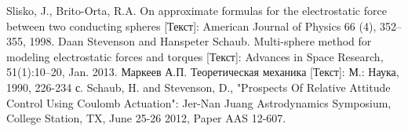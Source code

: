\begin{thebibliography}{99}
 Slisko, J., Brito-Orta, R.A. On approximate formulas for the electrostatic force between two conducting spheres [Текст]: American Journal of Physics 66 (4), 352–355, 1998.
 Daan Stevenson and Hanspeter Schaub. Multi-sphere method for modeling electrostatic forces and torques [Текст]: Advances in Space Research, 51(1):10–20, Jan. 2013.
 Маркеев А.П. Теоретическая механика [Текст]: М.: Наука, 1990, 226-234 с.
 Schaub, H. and Stevenson, D., "Prospects Of Relative Attitude Control Using Coulomb Actuation"\space[Текст]: Jer-Nan Juang Astrodynamics Symposium, College Station, TX, June 25-26 2012, Paper AAS 12-607.
\end{thebibliography}